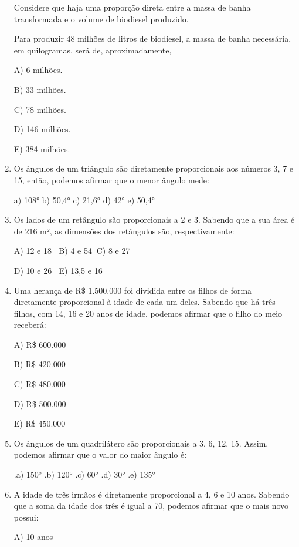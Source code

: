 \begin{multicols*}{2}
\begin{enumerate}
		      Considere que haja uma proporção direta entre a massa de banha transformada e o volume de biodiesel produzido.

		      Para produzir 48 milhões de litros de biodiesel, a massa de banha necessária, em quilogramas, será de, aproximadamente,

		      A) 6 milhões.

		      B) 33 milhões.

		      C) 78 milhões.

		      D) 146 milhões.

		      E) 384 milhões.

		\item Os ângulos de um triângulo são diretamente proporcionais aos números 3, 7 e 15, então, podemos afirmar que o menor ângulo mede:

		      a) 108°  b) 50,4°  c) 21,6°  d) 42°  e) 50,4°

		\item Os lados de um retângulo são proporcionais a 2 e 3. Sabendo que a sua área é de 216 m², as dimensões dos retângulos são, respectivamente:

		      A) 12 e 18 $ \ $ B) 4 e 54$ \ $ C) 8 e 27

		      D) 10 e 26 $ \ $ E) 13,5 e 16

		\item Uma herança de R\$ 1.500.000 foi dividida entre os filhos de forma diretamente proporcional à idade de cada um deles. Sabendo que há três filhos, com 14, 16 e 20 anos de idade, podemos afirmar que o filho do meio receberá:

		      A) R\$ 600.000

		      B) R\$ 420.000

		      C) R\$ 480.000

		      D) R\$ 500.000

		      E) R\$ 450.000

		\item Os ângulos de um quadrilátero são proporcionais a 3, 6, 12, 15. Assim, podemos afirmar que o valor do maior ângulo é:

		      .a) 150°  .b) 120°  .c) 60°  .d) 30°  .e) 135°

		\item A idade de três irmãos é diretamente proporcional a 4, 6 e 10 anos. Sabendo que a soma da idade dos três é igual a 70, podemos afirmar que o mais novo possui:

		      A) 10 anos


\end{enumerate}
\end{multicols*}
